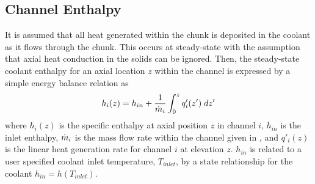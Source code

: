   \subsection{Channel Enthalpy}
    It is assumed that all heat generated within the chunk is deposited in the
    coolant as it flows through the chunk. This occurs at steady-state with the
    assumption that axial heat conduction in the solids can be ignored. Then, 
    the steady-state coolant enthalpy for an axial location $z$ within the 
    channel is expressed by a simple energy balance relation as
    \begin{equation}
      \label{eq:continuous_heat_balance}
      h_i(z) = h_{in} + \frac{1}{\dot{m}_i} \int_0^z q'_i(z') \; dz'
    \end{equation}
    where $h_i(z)$ is the specific enthalpy at axial position $z$ in channel 
    $i$, $h_{in}$ is the inlet enthalpy, $\dot{m}_i$ is the mass flow rate within
    the channel given in , and 
    $q'_i(z)$ is the linear heat generation rate for channel $i$ at elevation 
    $z$. $h_{in}$ is related to a user specified coolant inlet temperature,
    $T_{inlet}$, by a state relationship for the coolant 
    $h_{in} = h(T_{inlet})$.  

